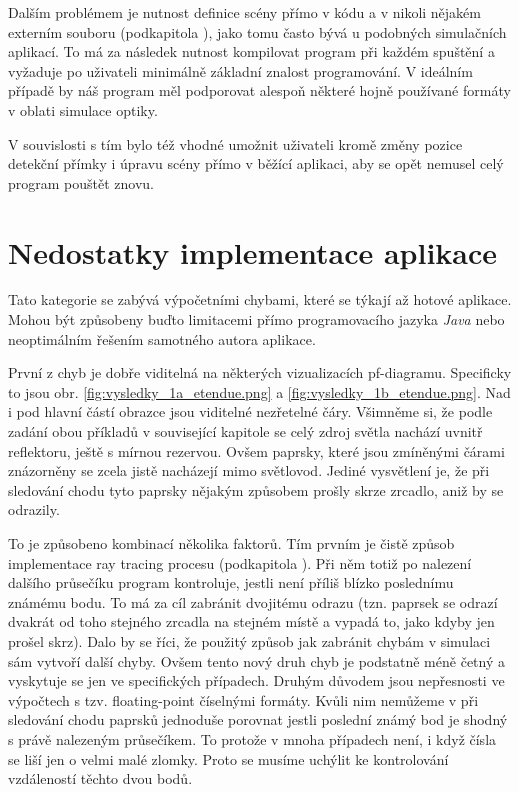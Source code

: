 Dalším problémem je nutnost definice scény přímo v kódu a v nikoli nějakém externím souboru (podkapitola ), jako tomu často bývá u podobných simulačních aplikací. To má za následek nutnost kompilovat program při každém spuštění a vyžaduje po uživateli minimálně základní znalost programování. V ideálním případě by náš program měl podporovat alespoň některé hojně používané formáty v oblati simulace optiky.

V souvislosti s tím bylo též vhodné umožnit uživateli kromě změny pozice detekční přímky i úpravu scény přímo v běžící aplikaci, aby se opět nemusel celý program pouštět znovu.

\section{Nedostatky implementace aplikace}

Tato kategorie se zabývá výpočetními chybami, které se týkají až hotové aplikace. Mohou být způsobeny buďto limitacemi přímo programovacího jazyka \emph{Java} nebo neoptimálním řešením samotného autora aplikace.

První z chyb je dobře viditelná na některých vizualizacích pf-diagramu. Specificky to jsou obr. \ref{fig:vysledky_1a_etendue.png} a \ref{fig:vysledky_1b_etendue.png}. Nad i pod hlavní částí obrazce jsou viditelné nezřetelné čáry. Všimněme si, že podle zadání obou příkladů v související kapitole  se celý zdroj světla nachází uvnitř reflektoru, ještě s mírnou rezervou. Ovšem paprsky, které jsou zmíněnými čárami znázorněny se zcela jistě nacházejí mimo světlovod. Jediné vysvětlení je, že při sledování chodu tyto paprsky nějakým způsobem prošly skrze zrcadlo, aniž by se odrazily.

To je způsobeno kombinací několika faktorů. Tím prvním je čistě způsob implementace ray tracing procesu (podkapitola ). Při něm totiž po nalezení dalšího průsečíku program kontroluje, jestli není příliš blízko poslednímu známému bodu. To má za cíl zabránit dvojitému odrazu (tzn. paprsek se odrazí dvakrát od toho stejného zrcadla na stejném místě a vypadá to, jako kdyby jen prošel skrz). Dalo by se říci, že použitý způsob jak zabránit chybám v simulaci sám vytvoří další chyby. Ovšem tento nový druh chyb je podstatně méně četný a vyskytuje se jen ve specifických případech. Druhým důvodem jsou nepřesnosti ve výpočtech s tzv. floating-point číselnými formáty. \parencite{ieee2008floating} Kvůli nim nemůžeme v při sledování chodu paprsků jednoduše porovnat jestli poslední známý bod je shodný s právě nalezeným průsečíkem. To protože v mnoha případech není, i když čísla se liší jen o velmi malé zlomky. Proto se musíme uchýlit ke kontrolování vzdáleností těchto dvou bodů.

